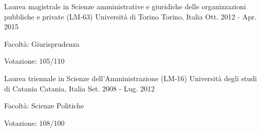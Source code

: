 


\begin{cventries}


\cventry
{Laurea magistrale in Scienze amministrative e giuridiche delle organizzazioni pubbliche e private (LM-63)} %
{Università di Torino} %
{Torino, Italia} %
{Ott. 2012 - Apr. 2015} %
{ %
	\begin{cvitems}
		\item {Facoltà: Giurisprudenza}
		\item {Votazione: 105/110}
	\end{cvitems}
}


\cventry
{Laurea triennale in Scienze dell'Amministrazione (LM-16)} %
{Università degli studi di Catania} %
{Catania, Italia} %
{Set. 2008 - Lug. 2012} %
{ %
	\begin{cvitems}
		\item {Facoltà: Scienze Politiche}
		\item {Votazione: 108/100}
	\end{cvitems}
}


\end{cventries}

